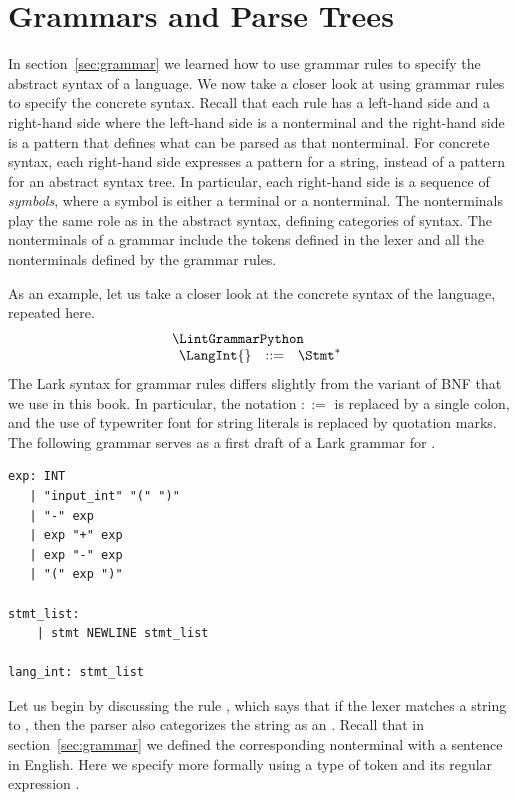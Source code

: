 \documentclass[7x10]{TimesAPriori_MIT}%
\numberwithin{theorem}{chapter}
\numberwithin{definition}{chapter}
\numberwithin{equation}{chapter}
\begin{document}
{\section{Grammars and Parse Trees}
\label{sec:CFG}

In section~\ref{sec:grammar} we learned how to use grammar rules to
specify the abstract syntax of a language. We now take a closer look
at using grammar rules to specify the concrete syntax. Recall that
each rule has a left-hand side and a right-hand side where the
left-hand side is a nonterminal and the right-hand side is a pattern
that defines what can be parsed as that nonterminal.  For concrete
syntax, each right-hand side expresses a pattern for a string, instead
of a pattern for an abstract syntax tree. In particular, each
right-hand side is a sequence of
\emph{symbols}, where a symbol is either a
terminal or a nonterminal. The nonterminals play the same role as in
the abstract syntax, defining categories of syntax. The nonterminals
of a grammar include the tokens defined in the lexer and all the
nonterminals defined by the grammar rules.

As an example, let us take a closer look at the concrete syntax of the
\LangInt{} language, repeated here.
\[
\begin{array}{l}
  \LintGrammarPython  \\
  \begin{array}{rcl}
    \LangInt{} &::=& \Stmt^{*}
  \end{array}
\end{array}
\]
The Lark syntax for grammar rules differs slightly from the variant of
BNF that we use in this book. In particular, the notation $::=$ is
replaced by a single colon, and the use of typewriter font for string
literals is replaced by quotation marks. The following grammar serves
as a first draft of a Lark grammar for \LangInt{}.
\begin{center}
\begin{minipage}{0.95\textwidth}
\begin{lstlisting}[escapechar=$]
exp: INT
   | "input_int" "(" ")"
   | "-" exp
   | exp "+" exp
   | exp "-" exp
   | "(" exp ")"

stmt_list:
    | stmt NEWLINE stmt_list

lang_int: stmt_list
\end{lstlisting}
\end{minipage}
\end{center}

Let us begin by discussing the rule , which says that
if the lexer matches a string to , then the parser also
categorizes the string as an .  Recall that in
section~\ref{sec:grammar} we defined the corresponding \Int{}
nonterminal with a sentence in English. Here we specify 
more formally using a type of token  and its regular
expression .

}
\end{document}
